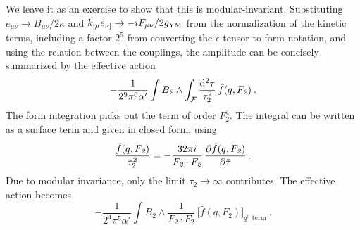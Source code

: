 \noindent We leave it as an exercise to show that this is modular-invariant. Substituting $e_{\mu\nu} \to B_{\mu\nu}/2\kappa$ and $k_{[\mu}e_{\nu]} \to -i F_{\mu\nu}/2g_{\mathrm{YM}}$ from the normalization of the kinetic terms, including a factor $2^5$ from converting the $\epsilon$-tensor to form notation, and using the relation between the couplings, the amplitude can be concisely summarized by the effective action
\begin{equation}
	-\frac{1}{2^9\pi^6\alpha'}\int B_{\textit{2}}\wedge \int_{\mathcal{F}}\frac{\mathrm{d}^2\tau}{\tau_2^2}\,\hat{f}(q,F_{\textit{2}}) \:. \label{12.6.18}
\end{equation}
The form integration picks out the term of order $F_{\textit{2}}^4$. The integral can be written as a surface term and given in closed form, using
\begin{equation}
	\frac{\hat{f}(q,F_{\textit{2}})}{\tau_2^2} = -\frac{32\pi i}{F_{\textit{2}}\cdot F_{\textit{2}}}\,\frac{\partial\hat{f}(q,F_{\textit{2}})}{\partial\bar{\tau}} \:. \label{12.6.19}
\end{equation}
Due to modular invariance, only the limit $\tau_2 \to \infty$ contributes. The effective action becomes
\begin{equation}
	-\frac{1}{2^4\pi^5\alpha'}\int B_{\textit{2}}\wedge \frac{1}{F_{\textit{2}}\cdot F_{\textit{2}}}\,\bigl[\hat{f}(q,F_{\textit{2}})\bigr]_{q^0\text{ term}} \:. \label{12.6.20}
\end{equation}
